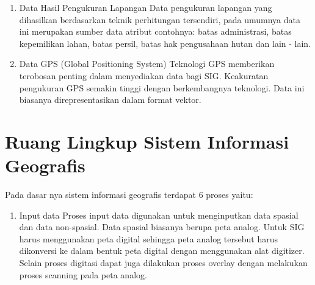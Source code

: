 \begin{enumerate}
\begin{enumerate}
\item Data Hasil Pengukuran Lapangan
\subitem  Data pengukuran lapangan yang dihasilkan berdasarkan teknik perhitungan tersendiri, pada umumnya data ini merupakan sumber data atribut contohnya: batas administrasi, batas kepemilikan lahan, batas persil, batas hak pengusahaan hutan dan lain - lain.

\item Data GPS (Global Positioning System)
\subitem Teknologi GPS memberikan terobosan penting dalam menyediakan data bagi SIG. Keakuratan pengukuran GPS semakin tinggi dengan berkembangnya teknologi. Data ini biasanya direpresentasikan dalam format vektor. 

\end{enumerate}
\end{enumerate}

\section{Ruang Lingkup Sistem Informasi Geografis}
Pada dasar nya sistem informasi geografis terdapat 6 proses yaitu:
\begin{enumerate}
\item Input data
\subitem Proses input data digunakan untuk menginputkan data spasial dan data non-spasial. Data spasial biasanya berupa peta analog. Untuk SIG harus menggunakan peta digital sehingga peta analog tersebut harus dikonversi ke dalam bentuk peta digital dengan menggunakan alat digitizer. Selain proses digitasi dapat juga dilakukan proses overlay dengan melakukan proses scanning pada peta analog.

\end{enumerate}

